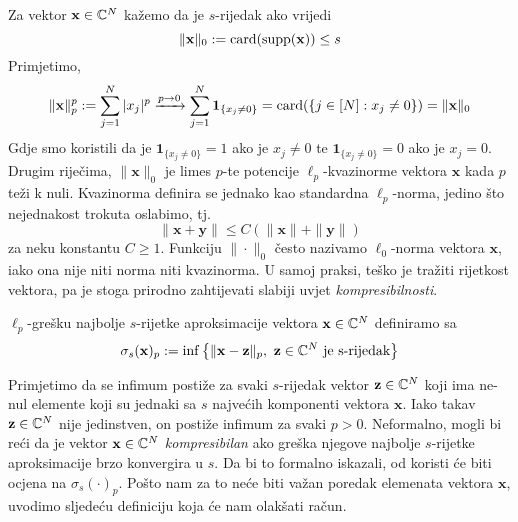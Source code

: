 \documentclass[a4paper,twoside,12pt]{memoir} %
\newcommand{\vect}[1]{\mathbf{#1}}
\renewcommand{\vec}{\vect}
\newcommand{\card}{\text{\normalfont{card}}}
\newcommand{\supp}{\text{\normalfont{supp}}}
\begin{document}
\noindent Za vektor $\vec{x}\in\C^{N}$ ka\v{z}emo da je $s$-rijedak ako vrijedi $$\|\vec{x}\|_0 := \card(\supp(\vec{x})) \leq s$$
Primjetimo,
$$\|\vec{x}\|_p^p := \sum_{j=1}^N|x_j|^p \xrightarrow{p\rightarrow 0} \sum_{j=1}^N\mathbf{1}_{\{x_j \neq 0\}} = \card(\{j \in [N]:x_j \neq 0\}) = \|\vec{x}\|_0$$
Gdje smo koristili da je $\mathbf{1}_{\{x_j \neq 0\}} = 1$  ako je $x_j \neq 0$ te $\mathbf{1}_{\{x_j \neq 0\}} = 0$  ako je $x_j = 0$. Drugim rije\v{c}ima, $\|\vec{x}\|_0$ je limes $p$-te potencije $\ell_p$-kvazinorme vektora $\vec{x}$ kada $p$ te\v{z}i k nuli. Kvazinorma definira se jednako kao standardna $\ell_p$-norma, jedino \v{s}to nejednakost trokuta oslabimo, tj. 
$$\|\vec{x}+\vec{y}\|\leq C(\|\vec{x}\|+\|\vec{y}\|)$$ 
za neku konstantu $C \geq 1$.
Funkciju $\|\cdot\|_0$ \v{c}esto nazivamo $\ell_0$-norma vektora $\vec x$, iako  ona nije niti norma niti kvazinorma. U samoj praksi, te\v{s}ko je tra\v{z}iti rijetkost vektora, pa je stoga prirodno zahtijevati slabiji uvjet \textit{kompresibilnosti}.  
\begin{defn}\label{greska_naj_s_aprox}
    $\ell_p$-gre\v{s}ku najbolje $s$-rijetke aproksimacije vektora $\vec{x}\in\C^{N}$ definiramo sa 
    $$\sigma_s(\vec{x})_p := \inf\big\{\|\vec{x}-\vec{z}\|_p,\ \vec{z} \in \C^{N} \ \text{je s-rijedak}\big\}$$
\end{defn}
\indent Primjetimo da se infimum posti\v{z}e za svaki $s$-rijedak vektor $\vec{z} \in \C^{N}$ koji ima ne-nul elemente koji su jednaki sa $s$ najve\'cih komponenti vektora $\vec{x}$. Iako takav $\vec{z} \in \C^{N}$ nije jedinstven, on posti\v{z}e infimum za svaki $p > 0$. Neformalno, mogli bi re\'ci da je vektor $\vec{x} \in \C^{N}$ \textit{kompresibilan} ako gre\v{s}ka njegove najbolje $s$-rijetke aproksimacije brzo konvergira u $s$. Da bi to formalno iskazali, od koristi \'ce biti ocjena na $\sigma_s(\cdot)_p$. Po\v{s}to nam za to ne\'ce biti va\v{z}an poredak elemenata vektora $\vec{x}$, uvodimo sljede\'cu definiciju koja \'ce nam olak\v{s}ati ra\v{c}un.
\end{document}
